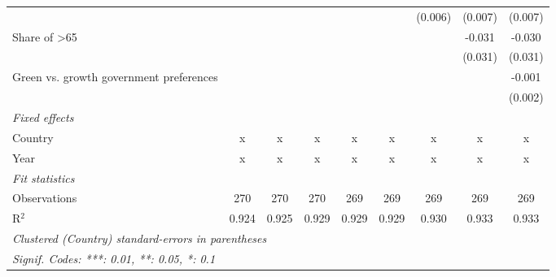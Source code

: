 \begin{table}[htbp]
\begin{tabular}{lcccccccc}
                                              &         &             &         &         &         & (0.006) & (0.007) & (0.007)\\   
      Share of >65                            &         &             &         &         &         &         & -0.031  & -0.030\\   
                                              &         &             &         &         &         &         & (0.031) & (0.031)\\   
      Green vs. growth government preferences &         &             &         &         &         &         &         & -0.001\\   
                                              &         &             &         &         &         &         &         & (0.002)\\   
      \emph{Fixed effects}\\
      Country                                 & x       & x           & x       & x       & x       & x       & x       & x\\  
      Year                                    & x       & x           & x       & x       & x       & x       & x       & x\\  
      \midrule \emph{Fit statistics}\\
      Observations                            & 270     & 270         & 270     & 269     & 269     & 269     & 269     & 269\\  
      R$^2$                                   & 0.924   & 0.925       & 0.929   & 0.929   & 0.929   & 0.930   & 0.933   & 0.933\\  
      \midrule
      \multicolumn{9}{l}{\emph{Clustered (Country) standard-errors in parentheses}}\\
      \multicolumn{9}{l}{\emph{Signif. Codes: ***: 0.01, **: 0.05, *: 0.1}}\\
   \end{tabular}
\end{table}


